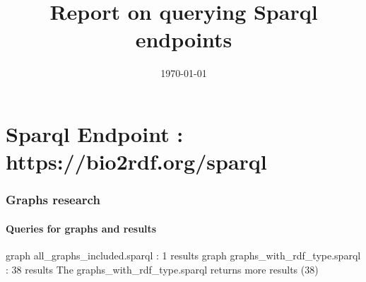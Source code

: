 \documentclass[a4paper,12pt]{article}
\begin{document}
\title{Report on querying Sparql endpoints}
\date{\today}

\part{Sparql Endpoint : https://bio2rdf.org/sparql}
\section{Graphs research}
\subsection{Queries for graphs and results}
graph all\_graphs\_included.sparql : 1 results 
\newline
graph graphs\_with\_rdf\_type.sparql : 38 results 
\newline
The graphs\_with\_rdf\_type.sparql returns more results (38)
\end{document}
